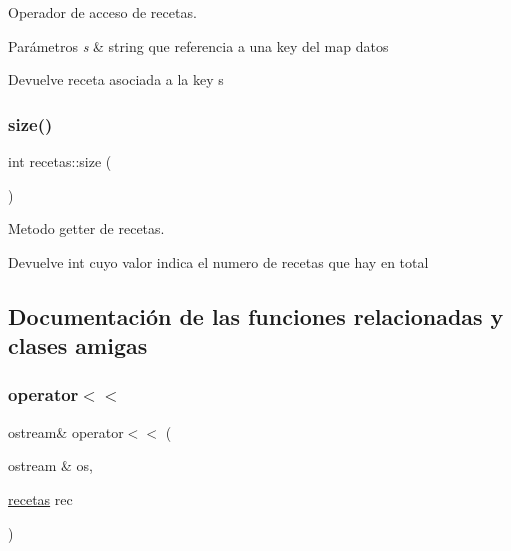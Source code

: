 Operador de acceso de recetas. 


\begin{DoxyParams}{Parámetros}
{\em s} & string que referencia a una key del map datos \\
\hline
\end{DoxyParams}
\begin{DoxyReturn}{Devuelve}
receta asociada a la key s 
\end{DoxyReturn}
\mbox{\label{classrecetas_a9d208c157f2dc674b48e11d359de911a}} 
\subsubsection{\texorpdfstring{size()}{size()}}
{\footnotesize\ttfamily int recetas\+::size (\begin{DoxyParamCaption}{ }\end{DoxyParamCaption})}



Metodo getter de recetas. 

\begin{DoxyReturn}{Devuelve}
int cuyo valor indica el numero de recetas que hay en total 
\end{DoxyReturn}


\subsection{Documentación de las funciones relacionadas y clases amigas}
\mbox{\label{classrecetas_a6d22e5920fcf4c27d4bc01fc88c6bd84}} 
\subsubsection{\texorpdfstring{operator$<$$<$}{operator<<}}
{\footnotesize\ttfamily ostream\& operator$<$$<$ (\begin{DoxyParamCaption}\item[{ostream \&}]{os,  }\item[{\hyperlink{classrecetas}{recetas}}]{rec }\end{DoxyParamCaption})\hspace{0.3cm}{\ttfamily [friend]}}



